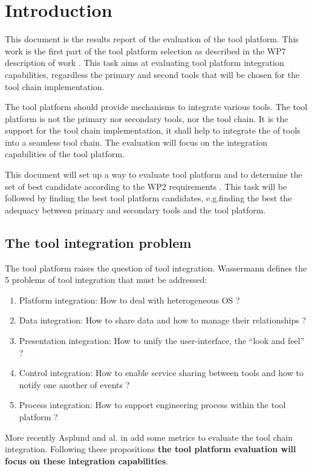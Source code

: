 \chapter{Introduction}
This document is the results report of the evaluation of the tool
platform. This work is the first part of the tool platform selection
as described in the WP7 description of work \cite{WP7_D01}.
This task aims at evaluating tool platform integration capabilities,
regardless the primary and second tools that will be chosen for the
tool chain implementation.

The tool platform should provide mechanisms to integrate various
tools. The tool platform is not the primary nor secondary tools, nor
the tool chain. It is the support for the tool chain implementation,
it shall help to integrate the of tools into a seamless tool chain.
The evaluation will focus on the integration capabilities of the tool platform.

This document will set up a way to evaluate tool platform and to
determine the set of best candidate according to the WP2 requirements
\cite{baro_requirements_2013}. This task will be followed by finding
the best tool platform candidates, e.g.finding the best the adequacy
between primary and secondary tools and the tool platform.


\section{The tool integration problem}
The tool platform raises the question of tool integration.
Wassermann \cite{wasserman_tool_1990}  defines the 5 problems of tool integration that must
be addressed:
\begin{enumerate}
\item Platform integration: How to deal with heterogeneous OS ?
\item Data integration: How to share data and how to manage their
  relationships ?
\item Presentation integration: How to unify the user-interface, the ``look and feel'' ?
\item Control integration: How to enable service sharing between tools and
how to notify one another of events ?
\item Process integration: How to support engineering process within
  the tool platform ?
\end{enumerate}
More recently  Asplund and al. in \cite{asplund_tool_2011} add some
metrics to evaluate the tool chain integration. Following these
propositions {\bf the tool platform evaluation will focus on
these integration capabilities}. 

